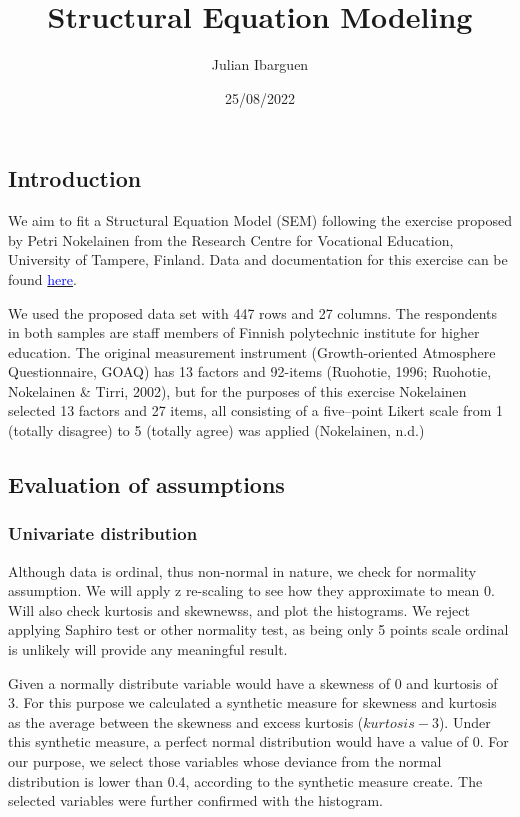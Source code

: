 \documentclass[
]{article}
\title{Structural Equation Modeling}
\author{Julian Ibarguen}
\date{25/08/2022}
\begin{document}
\maketitle

{
\setcounter{tocdepth}{3}
\tableofcontents
}
\hypertarget{introduction}{%
\subsection{Introduction}\label{introduction}}

We aim to fit a Structural Equation Model (SEM) following the exercise
proposed by Petri Nokelainen from the Research Centre for Vocational
Education, University of Tampere, Finland. Data and documentation for
this exercise can be found
\href{https://www.scribd.com/document/222003310/Sem-Exercise-v2-5}{\textcolor{blue}{here}}.

We used the proposed data set with 447 rows and 27 columns. The
respondents in both samples are staff members of Finnish polytechnic
institute for higher education. The original measurement instrument
(Growth-oriented Atmosphere Questionnaire, GOAQ) has 13 factors and
92-items (Ruohotie, 1996; Ruohotie, Nokelainen \& Tirri, 2002), but for
the purposes of this exercise Nokelainen selected 13 factors and 27
items, all consisting of a five--point Likert scale from 1 (totally
disagree) to 5 (totally agree) was applied (Nokelainen, n.d.)

\hypertarget{evaluation-of-assumptions}{%
\subsection{Evaluation of assumptions}\label{evaluation-of-assumptions}}

\hypertarget{univariate-distribution}{%
\subsubsection{Univariate distribution}\label{univariate-distribution}}

Although data is ordinal, thus non-normal in nature, we check for
normality assumption. We will apply z re-scaling to see how they
approximate to mean 0. Will also check kurtosis and skewnewss, and plot
the histograms. We reject applying Saphiro test or other normality test,
as being only 5 points scale ordinal is unlikely will provide any
meaningful result.

Given a normally distribute variable would have a skewness of 0 and
kurtosis of 3. For this purpose we calculated a synthetic measure for
skewness and kurtosis as the average between the skewness and excess
kurtosis (\(kurtosis - 3\)). Under this synthetic measure, a perfect
normal distribution would have a value of 0. For our purpose, we select
those variables whose deviance from the normal distribution is lower
than 0.4, according to the synthetic measure create. The selected
variables were further confirmed with the histogram.
\end{document}
